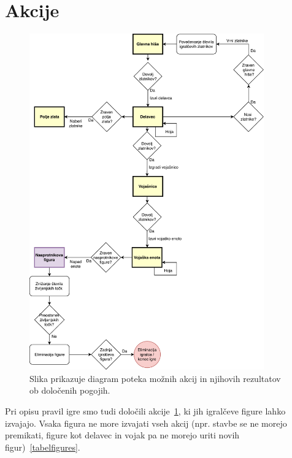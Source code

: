 \documentclass[a4paper, 12pt]{book}
\begin{document}
\section{Akcije}

\begin{figure}[h!]
	\begin{center}
		\includegraphics[width=0.9\textwidth]{photos/prikazAkcij.pdf}
	\end{center}
	\caption{Slika prikazuje diagram poteka možnih akcij in njihovih rezultatov ob določenih pogojih.}
	\label{picActions}
\end{figure}

Pri opisu pravil igre smo tudi določili akcije~\ref{picActions}, ki jih igralčeve figure lahko izvajajo. 
Vsaka figura ne more izvajati vseh akcij (npr. stavbe se ne morejo premikati, figure kot delavec in vojak pa ne morejo uriti novih figur)~\ref{tabelfigures}.
\end{document}

